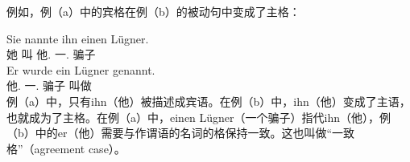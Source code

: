 例如，例（a）中的宾格在例（b）的被动句中变成了主格：

\eal
\ex 
\gll Sie nannte ihn einen Lügner.\\
	 她 叫 他.\acc{} 一.\acc{} 骗子\\
\ex 
\gll Er wurde ein Lügner genannt.\\
	 他.\nom{} \passivepst{} 一.\nom{} 骗子 叫做\\
\zl
例（a）中，只有ihn（他）被描述成宾语。在例（b）中，ihn（他）变成了主语，也就成为了主格。在例（a）中，einen Lügner（一个骗子）指代ihn（他），例（b）中的er（他）需要与作谓语的名词的格保持一致。这也叫做“一致格”（agreement case）。

